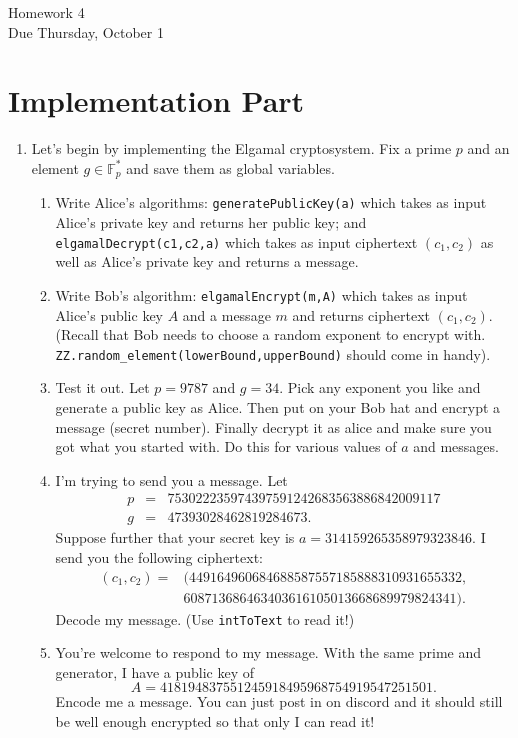 \documentclass[11pt]{article}
\newcommand{\bF}{\mathbb{F}}
\begin{document}
\begin{center}
\Large {Homework 4}\\
\small {Due Thursday, October 1}
\end{center}
\section*{Implementation Part}
\begin{enumerate}
  \item{
  Let's begin by implementing the Elgamal cryptosystem.  Fix a prime $p$ and an element $g\in\bF_p^*$ and save them as global variables.
  \begin{enumerate}
    \item{
    Write Alice's algorithms: \verb|generatePublicKey(a)| which takes as input Alice's private key and returns her public key; and \verb|elgamalDecrypt(c1,c2,a)| which takes as input ciphertext $(c_1,c_2)$ as well as Alice's private key and returns a message.
    }
    \item{
    Write Bob's algorithm: \verb|elgamalEncrypt(m,A)| which takes as input Alice's public key $A$ and a message $m$ and returns ciphertext $(c_1,c_2)$.  (Recall that Bob needs to choose a random exponent to encrypt with.  \verb|ZZ.random_element(lowerBound,upperBound)| should come in handy).
    }
    \item{
    Test it out.  Let $p=9787$ and $g=34$.  Pick any exponent you like and generate a public key as Alice.  Then put on your Bob hat and encrypt a message (secret number).  Finally decrypt it as alice and make sure you got what you started with.  Do this for various values of $a$ and messages.
    }
    \item{
    I'm trying to send you a message.  Let
    \begin{eqnarray*}
      p&=&753022235974397591242683563886842009117\\
      g&=&47393028462819284673.
    \end{eqnarray*}
    Suppose further that your secret key is $a=314159265358979323846$.  I send you the following ciphertext:
    \begin{eqnarray*}(c_1,c_2) =& (449164960684688587557185888310931655332,\\
      &608713686463403616105013668689979824341).
    \end{eqnarray*}
    Decode my message. (Use \verb|intToText| to read it!)
    }
    \item{
    You're welcome to respond to my message.  With the same prime and generator, I have a public key of
    \[A = 418194837551245918495968754919547251501.\]
    Encode me a message.  You can just post in on discord and it should still be well enough encrypted so that only I can read it!
    }
  \end{enumerate}
  }
\end{enumerate}
\end{document}
